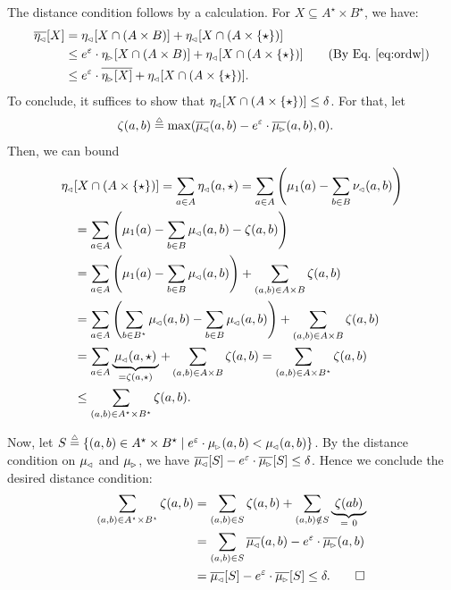 \documentclass{lmcs}
\begin{document}
  The distance condition follows by a calculation.  For $X \subseteq A^\star
  \times B^\star$, we have:
  \begin{align*}
    \overline{\eta\lside}[X]
      &= \eta\lside[X \cap (A \times B)]
           + \eta\lside[X \cap (A \times \{ \star \})] \\
      &\leq e^\epsilon \cdot \eta\rside[X \cap (A \times B)]
           + \eta\lside[X \cap (A \times \{ \star \})]
         \tag{By Eq.~\eqref{eq:ordw}} \\
      &\leq e^\epsilon \cdot \overline{\eta\rside[X]}
           + \eta\lside[X \cap (A \times \{ \star \})] .
  \end{align*}
  To conclude, it suffices to show that
  $\eta_{\mspace{-1.5mu}{\scriptscriptstyle \vartriangleleft}}[X \cap (A \times \{ \star \})] \leq \delta$.
  For that, let
  \begin{align*}
    \zeta(a, b)
      &\mathrel{\stackrel{\scriptscriptstyle \triangle}{=}} \max(\overline{\mu_{\mspace{-1.5mu}{\scriptscriptstyle \vartriangleleft}}}(a, b)
         - e^\varepsilon \cdot \overline{\mu_{\mspace{-1.5mu}{\scriptscriptstyle \vartriangleright}}}(a, b), 0) .
  \end{align*}
  Then, we can bound
  \begin{align*}
    \eta_{\mspace{-1.5mu}{\scriptscriptstyle \vartriangleleft}} & [X \cap (A \times \{ \star \})]
       = \sum_{a \in A} \eta_{\mspace{-1.5mu}{\scriptscriptstyle \vartriangleleft}}(a, \star)
       = \sum_{a \in A} \left( \mu_1(a) - \sum_{b \in B} \nu_{\mspace{-1.5mu}{\scriptscriptstyle \vartriangleleft}}(a, b) \right) \\
      &= \sum_{a \in A} \left( \mu_1(a) - \sum_{b \in B} \mu_{\mspace{-1.5mu}{\scriptscriptstyle \vartriangleleft}}(a, b) - \zeta(a, b) \right) \\
      &= \sum_{a \in A} \left( \mu_1(a) - \sum_{b \in B} \mu_{\mspace{-1.5mu}{\scriptscriptstyle \vartriangleleft}}(a, b) \right)
           + \sum_{(a, b) \in A \times B} \zeta(a, b) \\
      &= \sum_{a \in A} \left( \sum_{b \in B^\star} \mu_{\mspace{-1.5mu}{\scriptscriptstyle \vartriangleleft}}(a, b)
               - \sum_{b \in B} \mu_{\mspace{-1.5mu}{\scriptscriptstyle \vartriangleleft}}(a, b)
           \right) + \sum_{(a, b) \in A \times B} \zeta(a, b) \\
      &= \sum_{a \in A} \underbrace{\, \mu_{\mspace{-1.5mu}{\scriptscriptstyle \vartriangleleft}}(a, \star) \,}_{= \zeta(a, \star)}
           + \sum_{(a, b) \in A \times B} \zeta(a, b)
       = \sum_{(a, b) \in A \times B^\star} \zeta(a, b) \\
      &\leq \sum_{(a, b) \in A ^\star \times B^\star} \zeta(a, b) .
  \end{align*}

  Now, let
  $S \mathrel{\stackrel{\scriptscriptstyle \triangle}{=}} \{ (a, b) \in A^\star \times B^\star \mid e^\varepsilon \cdot
  \mu_{\mspace{-1.5mu}{\scriptscriptstyle \vartriangleright}}(a, b) < \mu_{\mspace{-1.5mu}{\scriptscriptstyle \vartriangleleft}}(a, b) \}$.
  By the distance condition on $\mu_{\mspace{-1.5mu}{\scriptscriptstyle \vartriangleleft}}$ and $\mu_{\mspace{-1.5mu}{\scriptscriptstyle \vartriangleright}}$, we have
  $\overline{\mu_{\mspace{-1.5mu}{\scriptscriptstyle \vartriangleleft}}}[S] - e^\varepsilon \cdot \overline{\mu_{\mspace{-1.5mu}{\scriptscriptstyle \vartriangleright}}}[S] \leq \delta$.
  Hence we conclude the desired distance condition:
  \begin{align*}
    \sum_{(a, b) \in A ^\star \times B^\star} \zeta(a, b)
      &= \sum_{(a, b) \in S} \zeta(a, b) + \sum_{(a, b) \notin S} \underbrace{
           \; \zeta(a b) \;}_{=\ 0} \\
      &= \sum_{(a, b) \in S} \overline{\mu_{\mspace{-1.5mu}{\scriptscriptstyle \vartriangleleft}}}(a, b) -
           e^\varepsilon \cdot \overline{\mu_{\mspace{-1.5mu}{\scriptscriptstyle \vartriangleright}}}(a, b) \\
      &= \overline{\mu_{\mspace{-1.5mu}{\scriptscriptstyle \vartriangleleft}}}[S] - e^\varepsilon \cdot \overline{\mu_{\mspace{-1.5mu}{\scriptscriptstyle \vartriangleright}}}[S]
       \leq \delta . \qedhere
  \end{align*}
\endproofatend
\end{document}
